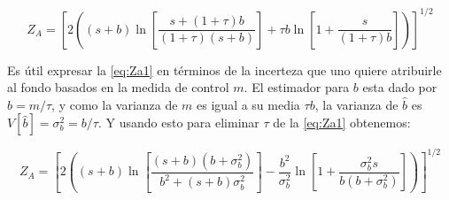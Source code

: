 \begin{equation}
  Z_A = \left[ 2 \left( (s+b) \ln \left[ \frac{s+(1+\tau)b}{(1+\tau)(s+b)} \right] + \tau b  \ln \left[ 1 + \frac{s}{(1+\tau)b} \right] \right) \right]^{1/2}
  \label{eq:Za1}
\end{equation}

Es útil expresar la {\eq} \eqref{eq:Za1} en términos de la incerteza que uno quiere
atribuirle al fondo basados en la medida de control $m$. El estimador para $b$ esta dado
por $\hat{b} = m/\tau$, y como la varianza de $m$ es igual a su media $\tau b$, la
varianza de $\hat{b}$ es $V[\hat{b}] = \sigma_b^2 = b/\tau$. Y usando esto para eliminar
$\tau$ de la {\eq} \eqref{eq:Za1} obtenemos:

\begin{equation}
  Z_A = \left[ 2 \left( (s+b) \ln \left[ \frac{(s+b)(b+\sigma_b^2)}{b^2+(s+b)\sigma_b^2} \right] - \frac{b^2}{\sigma_b^2} \ln \left[ 1 + \frac{\sigma_b^2 s}{b(b+\sigma_b^2)} \right] \right) \right]^{1/2}
  \label{eq:Za}
\end{equation}






